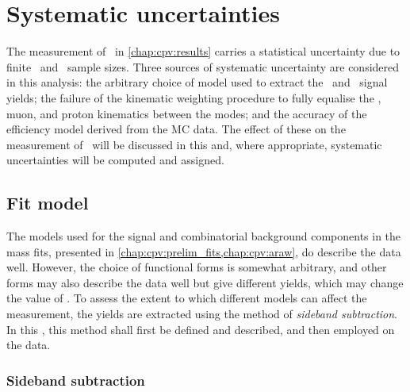 \chapter{Systematic uncertainties}
\label{chap:cpv:syst}

The measurement of \dACP\ in \cref{chap:cpv:results} carries a statistical 
uncertainty due to finite \pKK\ and \ppipi\ sample sizes.
Three sources of systematic uncertainty are considered in this analysis: the 
arbitrary choice of model used to extract the \PLambdac\ and \APLambdac\ signal 
yields; the failure of the kinematic weighting procedure to fully equalise the 
\PLambdab, muon, and proton kinematics between the modes; and the accuracy of 
the efficiency model derived from the \ac{MC} data.
The effect of these on the measurement of \dACP\ will be discussed in this 
 and, where appropriate, systematic uncertainties will 
be computed and assigned.

\section{Fit model}
\label{chap:cpv:syst:fit}

The models used for the signal and combinatorial background components in the 
mass fits, presented in \cref{chap:cpv:prelim_fits,chap:cpv:araw}, do describe 
the data well.
However, the choice of functional forms is somewhat arbitrary, and other forms 
may also describe the data well but give different yields, which may change the 
value of \dACP\@.
To assess the extent to which different models can affect the measurement, the 
yields are extracted using the method of \emph{sideband subtraction}.
In this , this method shall first be defined and 
described, and then employed on the data.

\subsection{Sideband subtraction}
\label{chap:cpv:syst:fit:sb}

